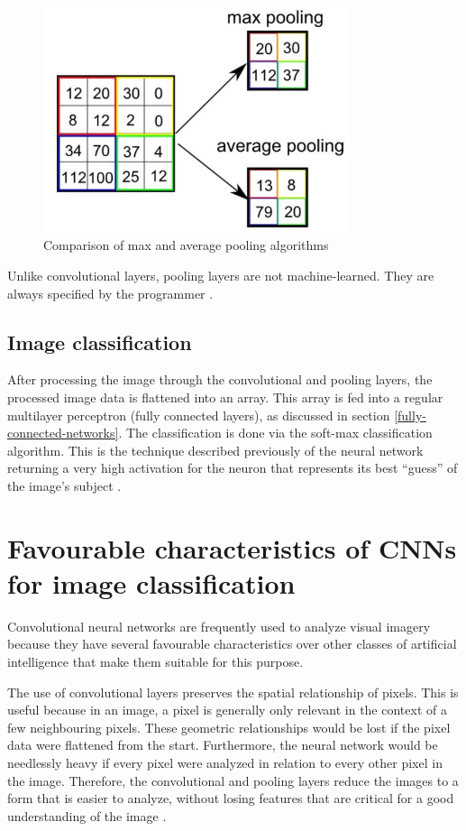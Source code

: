 ﻿\documentclass[12pt,a4paper,notitlepage]{article}
\begin{document}
\begin{figure}[htbp]
 \centering
  \includegraphics[width=0.80\textwidth]{images/pooling.jpg}
 \caption{Comparison of max and average pooling algorithms \cite{saha_comprehensive_2018}}
 \label{fig:pooling}
\end{figure}

Unlike convolutional layers, pooling layers are not machine-learned. They are always specified by the programmer \cite{brownlee_gentle_2019}.

\subsection{Image classification}
After processing the image through the convolutional and pooling layers, the processed image data is flattened into an array. This array is fed into a regular multilayer perceptron (fully connected layers), as discussed in section \ref{fully-connected-networks}. The classification is done via the soft-max classification algorithm. This is the technique described previously of the neural network returning a very high activation for the neuron that represents its best “guess” of the image's subject \cite{rosebrock_softmax_2016}.

\section{Favourable characteristics of CNNs for image classification}
Convolutional neural networks are frequently used to analyze visual imagery because they have several favourable characteristics over other classes of artificial intelligence that make them suitable for this purpose.

The use of convolutional layers preserves the spatial relationship of pixels. This is useful because in an image, a pixel is generally only relevant in the context of a few neighbouring pixels. These geometric relationships would be lost if the pixel data were flattened from the start. Furthermore, the neural network would be needlessly heavy if every pixel were analyzed in relation to every other pixel in the image. Therefore, the convolutional and pooling layers reduce the images to a form that is easier to analyze, without losing features that are critical for a good understanding of the image \cite{saha_comprehensive_2018}.
\end{document}
